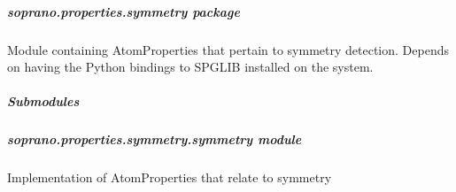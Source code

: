 \documentclass[letterpaper,10pt,english]{sphinxmanual}
\begin{document}
\begin{fulllineitems}
\begin{fulllineitems}
\label{doctree/soprano.properties.nmr.nmr:soprano.properties.nmr.nmr.MSReducedAnisotropy.default_name}
\end{fulllineitems}


\begin{fulllineitems}
\label{doctree/soprano.properties.nmr.nmr:soprano.properties.nmr.nmr.MSReducedAnisotropy.default_params}
\end{fulllineitems}


\begin{fulllineitems}
\label{doctree/soprano.properties.nmr.nmr:soprano.properties.nmr.nmr.MSReducedAnisotropy.extract}
\end{fulllineitems}


\end{fulllineitems}



\subparagraph{soprano.properties.symmetry package}
\label{doctree/soprano.properties.symmetry::doc}\label{doctree/soprano.properties.symmetry:soprano-properties-symmetry-package}\label{doctree/soprano.properties.symmetry:module-soprano.properties.symmetry}
Module containing AtomProperties that pertain to symmetry detection.
Depends on having the Python bindings to SPGLIB installed on the system.


\subparagraph{Submodules}
\label{doctree/soprano.properties.symmetry:submodules}

\subparagraph{soprano.properties.symmetry.symmetry module}
\label{doctree/soprano.properties.symmetry.symmetry:module-soprano.properties.symmetry.symmetry}\label{doctree/soprano.properties.symmetry.symmetry::doc}\label{doctree/soprano.properties.symmetry.symmetry:soprano-properties-symmetry-symmetry-module}
Implementation of AtomProperties that relate to symmetry
\end{document}
